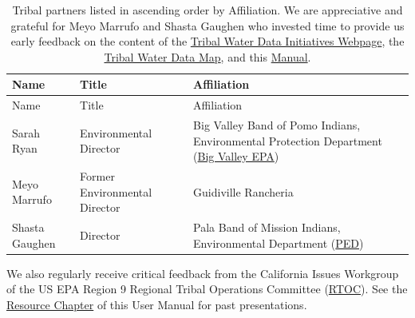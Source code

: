 \documentclass[
  letterpaper,
  DIV=11,
  numbers=noendperiod]{scrreprt}
\begin{document}
\begin{longtable}[]{@{}
  >{\raggedright\arraybackslash}p{}
  >{\raggedright\arraybackslash}p{}
  >{\raggedright\arraybackslash}p{}@{}}
\caption{Tribal partners listed in ascending order by Affiliation. We
are appreciative and grateful for Meyo Marrufo and Shasta Gaughen who
invested time to provide us early feedback on the content of the
\href{https://www.waterboards.ca.gov/resources/oima/tribal_water_data_initiatives/}{Tribal
Water Data Initiatives Webpage}, the
\href{https://gispublic.waterboards.ca.gov/portal/home/item.html?id=a71c1841907240e1a4d896c8cf2302a8}{Tribal
Water Data Map}, and this
\href{https://cawaterboarddatacenter.github.io/tribal-water-data-map-manual/}{Manual}.}\tabularnewline
\toprule\noalign{}
\begin{minipage}[b]{\linewidth}\raggedright
Name
\end{minipage} & \begin{minipage}[b]{\linewidth}\raggedright
Title
\end{minipage} & \begin{minipage}[b]{\linewidth}\raggedright
Affiliation
\end{minipage} \\
\midrule\noalign{}
\endfirsthead
\toprule\noalign{}
\begin{minipage}[b]{\linewidth}\raggedright
Name
\end{minipage} & \begin{minipage}[b]{\linewidth}\raggedright
Title
\end{minipage} & \begin{minipage}[b]{\linewidth}\raggedright
Affiliation
\end{minipage} \\
\midrule\noalign{}
\endhead
\bottomrule\noalign{}
\endlastfoot
Sarah Ryan & Environmental Director & Big Valley Band of Pomo Indians,
Environmental Protection Department
(\href{https://www.bvrancheria.com/epa}{Big Valley EPA}) \\
Meyo Marrufo & Former Environmental Director & Guidiville Rancheria \\
Shasta Gaughen & Director & Pala Band of Mission Indians, Environmental
Department (\href{http://ped.palatribe.com/}{PED}) \\
\end{longtable}

We also regularly receive critical feedback from the California Issues
Workgroup of the US EPA Region 9 Regional Tribal Operations Committee
(\href{https://www.epa.gov/tribal-pacific-sw/regional-tribal-operations-committee-rtoc}{RTOC}).
See the
\href{https://cawaterboarddatacenter.github.io/tribal-water-data-map-manual/resources.html}{Resource
Chapter} of this User Manual for past presentations.
\end{document}
